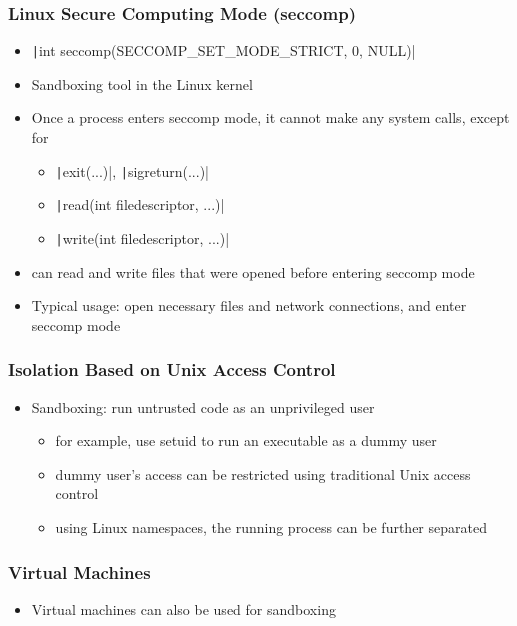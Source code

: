 \documentclass[final]{article}
\begin{document}
\subsubsection*{Linux Secure Computing Mode (seccomp)}
\begin{itemize}[nosep]
    \item \texttt|int seccomp(SECCOMP_SET_MODE_STRICT, 0, NULL)|
    \item Sandboxing tool in the Linux kernel
    \item Once a process enters seccomp mode, it cannot make any system calls, except for
          \begin{itemize}[nosep]
              \item \texttt|exit(...)|, \texttt|sigreturn(...)|
              \item \texttt|read(int filedescriptor, ...)|
              \item \texttt|write(int filedescriptor, ...)|
          \end{itemize}
    \item can read and write files that were opened before entering seccomp mode
    \item Typical usage: open necessary files and network connections, and enter seccomp mode
\end{itemize}
\subsubsection*{Isolation Based on Unix Access Control}
\begin{itemize}[nosep]
    \item Sandboxing: run untrusted code as an unprivileged user
          \begin{itemize}[nosep]
              \item for example, use setuid to run an executable as a dummy user
              \item dummy user's access can be restricted using traditional Unix access control
              \item using Linux namespaces, the running process can be further separated
          \end{itemize}
\end{itemize}
\subsubsection*{Virtual Machines}
\begin{itemize}[nosep]
    \item Virtual machines can also be used for sandboxing
\end{itemize}
\end{document}
